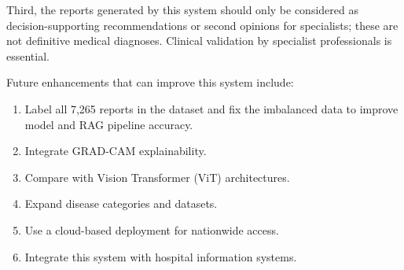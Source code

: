 Third, the reports generated by this system should only be considered as decision-supporting
recommendations or second opinions for specialists; these are not definitive medical diagnoses.
Clinical validation by specialist professionals is essential.

Future enhancements that can improve this system include:

\begin{enumerate}
    \item Label all 7,265 reports in the dataset and fix the imbalanced data to improve model
    and RAG pipeline accuracy.
    \item Integrate GRAD-CAM explainability.
    \item Compare with Vision Transformer (ViT) architectures.
    \item Expand disease categories and datasets.
    \item Use a cloud-based deployment for nationwide access.
    \item Integrate this system with hospital information systems.
\end{enumerate}

